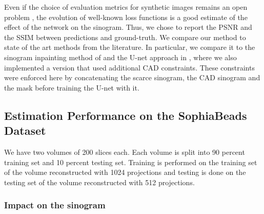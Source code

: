 \documentclass[../main.tex]{subfiles}
\begin{document}
\label{sec:results}
Even if the choice of evaluation metrics for synthetic images remains an open problem \cite{salimans2016improved}, the evolution of well-known loss functions is a good estimate of the effect of the network on the sinogram. Thus, we chose to report the PSNR and the SSIM between predictions and ground-truth. We compare our method to state of the art methods from the literature. In particular, we compare it to the sinogram inpainting method of \cite{yoo2019sinogram} and the U-net approach in \cite{lee2018deep}, where we also implemented a version that used additional CAD constraints. These constraints were enforced here by concatenating the scarce sinogram, the CAD sinogram and the mask before training the U-net with it.

\subsection{Estimation Performance on the SophiaBeads Dataset}
We have two volumes of 200 slices each. Each volume is split into 90 percent training set and 10 percent testing set. Training is performed on the training set of the volume reconstructed with 1024 projections and testing is done on the testing set of the volume reconstructed with 512 projections.

\subsubsection{Impact on the sinogram}
\label{impact_on_the_sinogram_sophiabeads}
\end{document}
